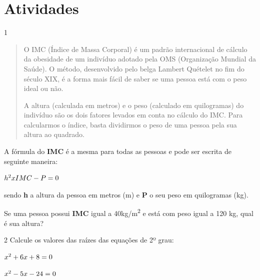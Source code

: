 \section{Atividades}

\num{1} 

\begin{quote}
O IMC (Índice de Massa Corporal) é um padrão internacional de cálculo
da obesidade de um indivíduo adotado pela OMS (Organização Mundial da
Saúde). O método, desenvolvido pelo belga Lambert Quételet no fim do
século XIX, é a forma mais fácil de saber se uma pessoa está com o peso
ideal ou não.

A altura (calculada em metros) e o peso (calculado em quilogramas) do
indivíduo são os dois fatores levados em conta no cálculo do IMC. Para
calcularmos o índice, basta dividirmos o peso de uma pessoa pela sua
altura ao quadrado.

\end{quote}

A fórmula do \textbf{IMC} é a mesma para todas as pessoas e pode ser
escrita de seguinte maneira:

$h\textsuperscript{2} x IMC - P = 0$

sendo \textbf{h} a altura da pessoa em metros (m) e \textbf{P} o seu peso 
em quilogramas (kg).

Se uma pessoa possui \textbf{IMC} igual a 40kg/m\textsuperscript{2} e está
com peso igual a 120 kg, qual é sua altura?

\begin{emptybox}



\vspace{5cm}
\end{emptybox}

\num{2} Calcule os valores das raízes das equações de 2º grau:

\begin{escolha}
  \item $x\textsuperscript{2} + 6x + 8 = 0$


  \item $x\textsuperscript{2} - 5x - 24 = 0$

\end{escolha}

